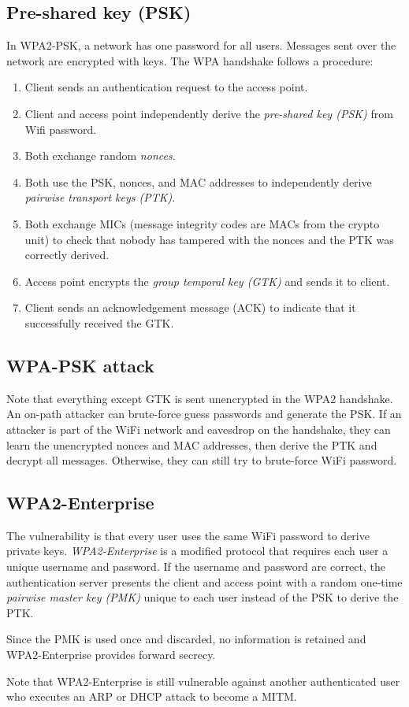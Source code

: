 \subsection{Pre-shared key (PSK)}
In WPA2-PSK, a network has one password for all users. Messages sent over the network are encrypted with keys. The WPA handshake follows a procedure:
\begin{enumerate}
    \item Client sends an authentication request to the access point.
    \item Client and access point independently derive the \emph{pre-shared key (PSK)} from Wifi password.
    \item Both exchange random \emph{nonces}.
    \item Both use the PSK, nonces, and MAC addresses to independently derive \emph{pairwise transport keys (PTK)}.
    \item Both exchange MICs (message integrity codes are MACs from the crypto unit) to check that nobody has tampered with the nonces and the PTK was correctly derived.
    \item Access point encrypts the \emph{group temporal key (GTK)} and sends it to client.
    \item Client sends an acknowledgement message (ACK) to indicate that it successfully received the GTK.
\end{enumerate}

\subsection{WPA-PSK attack}
Note that everything except GTK is sent unencrypted in the WPA2 handshake. An on-path attacker can brute-force guess passwords and generate the PSK. If an attacker is part of the WiFi network and eavesdrop on the handshake, they can learn the unencrypted nonces and MAC addresses, then derive the PTK and decrypt all messages. Otherwise, they can still try to brute-force WiFi password.

\subsection{WPA2-Enterprise}
The vulnerability is that every user uses the same WiFi password to derive private keys. \emph{WPA2-Enterprise} is a modified protocol that requires each user a unique username and password. If the username and password are correct, the authentication server presents the client and access point with a random one-time \emph{pairwise master key (PMK)} unique to each user instead of the PSK to derive the PTK. 

\medskip
Since the PMK is used once and discarded, no information is retained and WPA2-Enterprise provides forward secrecy.

\medskip
Note that WPA2-Enterprise is still vulnerable against another authenticated user who executes an ARP or DHCP attack to become a MITM.

